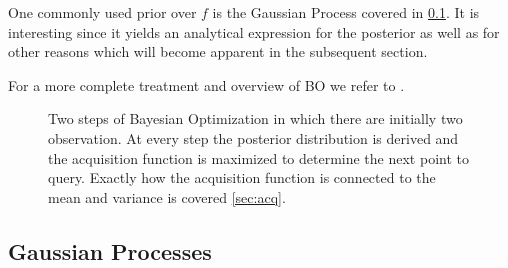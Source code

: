 \documentclass[conference,compsoc]{IEEEtran}
\theoremstyle{definition}
\begin{document}
        One commonly used prior over $f$ is the Gaussian Process covered in \cref{sec:gp}.
        It is interesting since it yields an analytical expression for the posterior as well as for other reasons which will become apparent in the subsequent section.

        For a more complete treatment and overview of BO we refer to \parencite{shahriari_taking_2016}.

        \begin{figure*}[t]
            \centering
            
            
            \caption{
                Two steps of Bayesian Optimization in which there are initially two observation.
                At every step the posterior distribution is derived and the acquisition function is maximized to determine the next point to query.
                Exactly how the acquisition function is connected to the mean and variance is covered \cref{sec:acq}.}
            \label{fig:bo}
        \end{figure*}

    \subsection{Gaussian Processes}\label{sec:gp}



                
\end{document}
